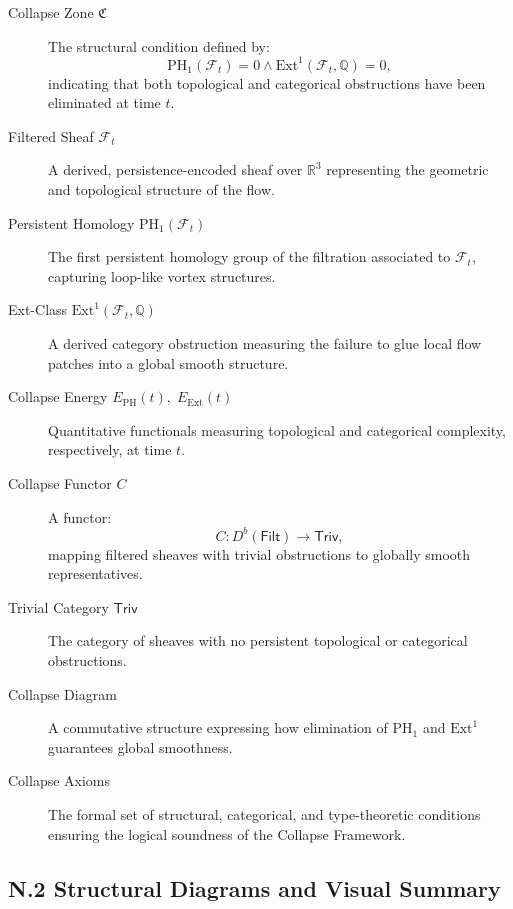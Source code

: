 \documentclass[11pt]{article}
\begin{document}
\begin{description}

  \item[Collapse Zone $\mathfrak{C}$]  
  The structural condition defined by:
  \[
  \mathrm{PH}_1(\mathcal{F}_t) = 0 \land \mathrm{Ext}^1(\mathcal{F}_t, \mathbb{Q}) = 0,
  \]
  indicating that both topological and categorical obstructions have been eliminated at time $t$.

  \item[Filtered Sheaf $\mathcal{F}_t$]  
  A derived, persistence-encoded sheaf over $\mathbb{R}^3$ representing the geometric and topological structure of the flow.

  \item[Persistent Homology $\mathrm{PH}_1(\mathcal{F}_t)$]  
  The first persistent homology group of the filtration associated to $\mathcal{F}_t$, capturing loop-like vortex structures.

  \item[Ext-Class $\mathrm{Ext}^1(\mathcal{F}_t, \mathbb{Q})$]  
  A derived category obstruction measuring the failure to glue local flow patches into a global smooth structure.

  \item[Collapse Energy $E_{\mathrm{PH}}(t),\; E_{\mathrm{Ext}}(t)$]  
  Quantitative functionals measuring topological and categorical complexity, respectively, at time $t$.

  \item[Collapse Functor $C$]  
  A functor:
  \[
  C : D^b(\mathsf{Filt}) \to \mathsf{Triv},
  \]
  mapping filtered sheaves with trivial obstructions to globally smooth representatives.

  \item[Trivial Category $\mathsf{Triv}$]  
  The category of sheaves with no persistent topological or categorical obstructions.

  \item[Collapse Diagram]  
  A commutative structure expressing how elimination of $\mathrm{PH}_1$ and $\mathrm{Ext}^1$ guarantees global smoothness.

  \item[Collapse Axioms]  
  The formal set of structural, categorical, and type-theoretic conditions ensuring the logical soundness of the Collapse Framework.

\end{description}

\subsection*{N.2 Structural Diagrams and Visual Summary}
\end{document}
